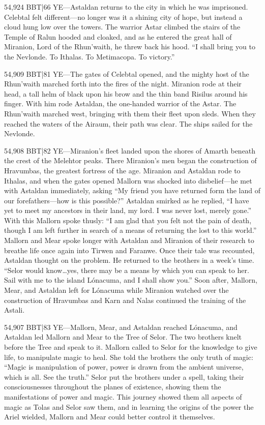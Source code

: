 \documentclass[smalldemyvopaper,11pt,twoside,onecolumn,openright,extrafontsizes]{memoir}
\begin{document}
54,924 BBT|66 YE—Astaldan returns to the city in which he was imprisoned. Celebtal felt different—no longer was it a shining city of hope, but instead a cloud hung low over the towers. The warrior Astar climbed the stairs of the Temple of Ralun hooded and cloaked, and as he entered the great hall of Miranion, Lord of the Rhun’waith, he threw back his hood.
“I shall bring you to the Nevlonde. To Ithalas. To Metimacopa. To victory.”

54,909 BBT|81 YE—The gates of Celebtal opened, and the mighty host of the Rhun’waith marched forth into the fires of the night. Miranion rode at their head, a tall helm of black upon his brow and the thin band Risilus around his finger. With him rode Astaldan, the one-handed warrior of the Astar. The Rhun’waith marched west, bringing with them their fleet upon sleds. When they reached the waters of the Airaum, their path was clear. The ships sailed for the Nevlonde.

54,908 BBT|82 YE—Miranion’s fleet landed upon the shores of Amarth beneath the crest of the Melehtor peaks. There Miranion’s men began the construction of Hravumbas, the greatest fortress of the age. Miranion and Astaldan rode to Ithalas, and when the gates opened Mallorn was shocked into disbelief—he met with Astaldan immediately, asking “My friend you have returned form the land of our forefathers—how is this possible?”
	Astaldan smirked as he replied, “I have yet to meet my ancestors in their land, my lord. I was never lost, merely gone.” With this Mallorn spoke thusly:
	“I am glad that you felt not the pain of death, though I am left further in search of a means of returning the lost to this world.” Mallorn and Mear spoke longer with Astaldan and Miranion of their research to breathe life once again into Tirwen and Faranwe. Once their tale was recounted, Astaldan thought on the problem. He returned to the brothers in a week’s time. “Selor would know…yes, there may be a means by which you can speak to her. Sail with me to the island Lónacuma, and I shall show you.”
	Soon after, Mallorn, Mear, and Astaldan left for Lónacuma while Miranion watched over the construction of Hravumbas and Karn and Nalas continued the training of the Astali.

54,907 BBT|83 YE—Mallorn, Mear, and Astaldan reached Lónacuma, and Astaldan led Mallorn and Mear to the Tree of Selor. The two brothers knelt before the Tree and speak to it. Mallorn called to Selor for the knowledge to give life, to manipulate magic to heal. She told the brothers the only truth of magic:
“Magic is manipulation of power, power is drawn from the ambient universe, which is all. See the truth.”
Selor put the brothers under a spell, taking their consciousnesses throughout the planes of existence, showing them the manifestations of power and magic. This journey showed them all aspects of magic as Tolas and Selor saw them, and in learning the origins of the power the Ariel wielded, Mallorn and Mear could better control it themselves.
\end{document}
